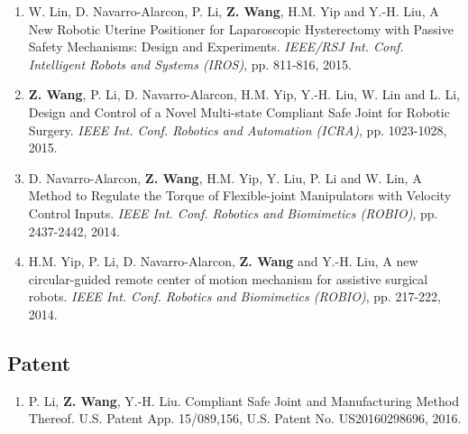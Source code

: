 \documentclass[10pt,letterpaper]{article}
\begin{document}
\begin{enumerate}
    \item W. Lin, D. Navarro-Alarcon, P. Li, \textbf{Z. Wang}, H.M. Yip and Y.-H. Liu,
    A New Robotic Uterine Positioner for Laparoscopic Hysterectomy with Passive Safety Mechanisms: Design and Experiments.
    \textit{{IEEE/RSJ} Int. Conf. Intelligent Robots and Systems (IROS)}, pp. 811-816, 2015.
    \item \textbf{Z. Wang}, P. Li, D. Navarro-Alarcon, H.M. Yip, Y.-H. Liu, W. Lin and L. Li,
    Design and Control of a Novel Multi-state Compliant Safe Joint for Robotic Surgery.
    \textit{{IEEE} Int. Conf. Robotics and Automation (ICRA)}, pp. 1023-1028, 2015.
    \item D. Navarro-Alarcon, \textbf{Z. Wang}, H.M. Yip, Y. Liu, P. Li and W. Lin,
    A Method to Regulate the Torque of Flexible-joint Manipulators with Velocity Control Inputs.
    \textit{{IEEE} Int. Conf. Robotics and Biomimetics (ROBIO)}, pp. 2437-2442, 2014.
    \item H.M. Yip, P. Li, D. Navarro-Alarcon, \textbf{Z. Wang} and Y.-H. Liu,
    A new circular-guided remote center of motion mechanism for assistive surgical robots.
    \textit{{IEEE} Int. Conf. Robotics and Biomimetics (ROBIO)}, pp. 217-222, 2014.
\end{enumerate}

\subsection*{Patent}
\begin{enumerate}
    \item P. Li, \textbf{Z. Wang}, Y.-H. Liu.
    Compliant Safe Joint and Manufacturing Method Thereof.
    U.S. Patent App. 15/089,156, U.S. Patent No. US20160298696, 2016.
\end{enumerate}

\end{document}
